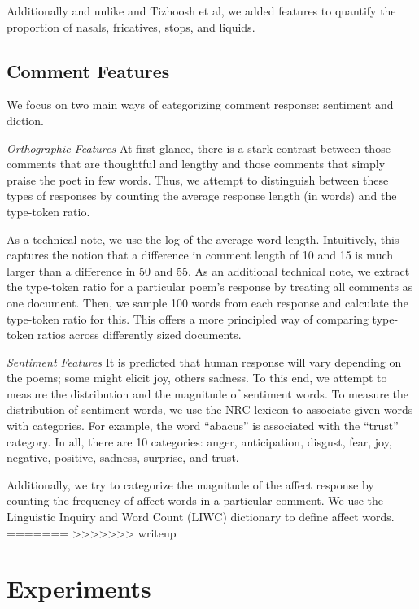 \documentclass[11pt]{article}
\begin{document}
Additionally and unlike  and Tizhoosh et al, we added features to quantify the proportion of nasals, fricatives, stops, and liquids. 


\subsection*{Comment Features}
We focus on two main ways of categorizing comment response: sentiment and diction.

\emph{Orthographic Features}
At first glance, there is a stark contrast between those comments that are thoughtful and lengthy and those comments that simply praise the poet in few words. Thus, we attempt to distinguish between these types of responses by counting the average response length (in words) and the type-token ratio.

As a technical note, we use the log of the average word length. Intuitively, this captures the notion that a difference in comment length of 10 and 15 is much larger than a difference in 50 and 55. As an additional technical note, we extract the type-token ratio for a particular poem's response by treating all comments as one document. Then, we sample 100 words from each response and calculate the type-token ratio for this. This offers a more principled way of comparing type-token ratios across differently sized documents.

\emph{Sentiment Features}
It is predicted that human response will vary depending on the poems; some might elicit joy, others sadness. To this end, we attempt to measure the distribution and the magnitude of sentiment words. To measure the distribution of sentiment words, we use the NRC lexicon to associate given words with categories. For example, the word ``abacus'' is associated with the ``trust'' category. In all, there are 10 categories: anger, anticipation, disgust, fear, joy, negative, positive, sadness, surprise, and trust.

Additionally, we try to categorize the magnitude of the affect response by counting the frequency of affect words in a particular comment. We use the Linguistic Inquiry and Word Count (LIWC) dictionary to define affect words.
=======
>>>>>>> writeup

\section{Experiments}
\end{document}
